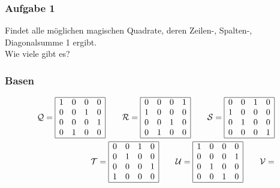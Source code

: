 \documentclass[11pt]{beamer}
\begin{document}
\begin{frame}
\frametitle{Aufgabe 1}
\begin{center}
Findet alle möglichen magischen Quadrate, deren Zeilen-, Spalten-, Diagonalsumme 1 ergibt.\\
Wie viele gibt es?
\end{center} 
\end{frame}

\begin{frame}
	\frametitle{Basen}
	
	 \begin{align*}
	\mathcal{Q} = 
	\begin{array}{|cccc|}
	\hline
	1 & 0 & 0 & 0 \\ 
	0 & 0 & 1 & 0 \\ 
	0 & 0 & 0 & 1 \\ 
	0 & 1 & 0 & 0 \\
	\hline
	\end{array} 
	\qquad
	\mathcal{R} = 
	\begin{array}{|cccc|}
	\hline
	0 & 0 & 0 & 1 \\ 
	1 & 0 & 0 & 0 \\ 
	0 & 0 & 1 & 0 \\ 
	0 & 1 & 0 & 0 \\
	\hline
	\end{array} 
	\qquad
	\mathcal{S} = 
	\begin{array}{|cccc|}
	\hline
	0 & 0 & 1 & 0 \\ 
	1 & 0 & 0 & 0 \\ 
	0 & 1 & 0 & 0 \\ 
	0 & 0 & 0 & 1 \\
	\hline
	\end{array}
	\\
	\mathcal{T} = 
	\begin{array}{|cccc|}
	\hline
	0 & 0 & 1 & 0 \\ 
	0 & 1 & 0 & 0 \\ 
	0 & 0 & 0 & 1 \\ 
	1 & 0 & 0 & 0 \\
	\hline
	\end{array} 
	\qquad
	\mathcal{U} = 
	\begin{array}{|cccc|}
	\hline
	1 & 0 & 0 & 0 \\ 
	0 & 0 & 0 & 1 \\ 
	0 & 1 & 0 & 0 \\ 
	0 & 0 & 1 & 0 \\
	\hline
	\end{array} 
	\qquad
	\mathcal{V} = 

\end{align*}
\end{frame}
\end{document}

